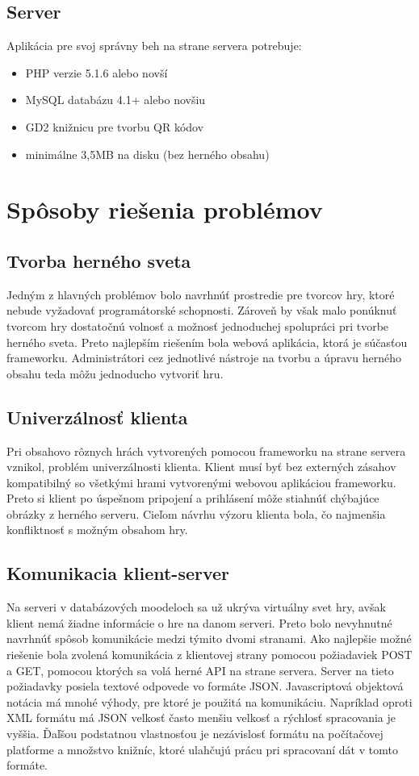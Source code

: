 \subsection{Server}
Aplikácia pre svoj správny beh na strane servera potrebuje:
\begin{itemize}
\item PHP verzie 5.1.6 alebo novší \cite{codeigniter-requirements}
\item MySQL databázu 4.1+ alebo novšiu \cite{codeigniter-requirements}
\item GD2 knižnicu pre tvorbu QR kódov \cite{qrgenerator-info}
\item minimálne 3,5MB na disku (bez herného obsahu)
\end{itemize}

\section{Spôsoby riešenia problémov}
\subsection{Tvorba herného sveta}
Jedným z hlavných problémov bolo navrhnúť prostredie pre tvorcov hry, ktoré nebude vyžadovať programátorské schopnosti. Zároveň by však malo ponúknuť tvorcom hry dostatočnú volnosť a možnosť jednoduchej spolupráci pri tvorbe herného sveta. Preto najlepším riešením bola webová aplikácia, ktorá je súčasťou frameworku. Administrátori cez jednotlivé nástroje na tvorbu a úpravu herného obsahu teda môžu jednoducho vytvoriť hru. 

\subsection{Univerzálnosť klienta}
Pri obsahovo rôznych hrách vytvorených pomocou frameworku na strane servera vznikol, problém univerzálnosti klienta. Klient musí byť bez externých zásahov kompatibilný so všetkými hrami vytvorenými webovou aplikáciou frameworku. Preto si klient po úspešnom pripojení a prihlásení môže stiahnúť chýbajúce obrázky z herného serveru. Cieľom návrhu výzoru klienta bola, čo najmenšia konfliktnosť s možným obsahom hry.

\subsection{Komunikacia klient-server}
Na serveri v databázových moodeloch sa už ukrýva virtuálny svet hry, avšak klient nemá žiadne informácie o hre na danom serveri. Preto bolo nevyhnutné navrhnúť spôsob komunikácie medzi týmito dvomi stranami. Ako najlepšie možné riešenie bola zvolená komunikácia z klientovej strany pomocou požiadaviek POST a GET, pomocou ktorých sa volá herné API na strane servera. Server na tieto požiadavky posiela textové odpovede vo formáte JSON. Javascriptová objektová notácia má mnohé výhody, pre ktoré je použitá na komunikáciu. Napríklad oproti XML formátu má JSON velkosť často menšiu velkosť a rýchlosť spracovania je vyššia. \cite{jsonVsXml} Ďaľšou podstatnou vlastnosťou je nezávislosť formátu na počítačovej platforme a množstvo knižníc, ktoré ulahčujú prácu pri spracovaní dát v tomto formáte.

